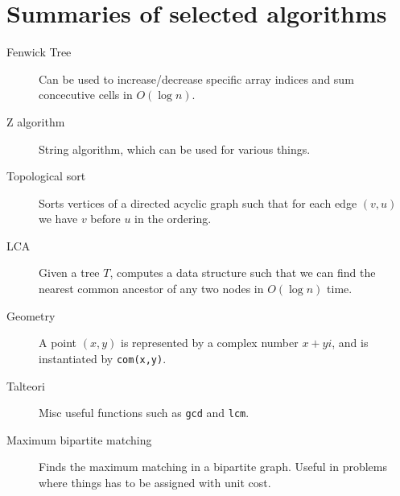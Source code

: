 \documentclass[a4paper,final,8pt]{article}
\begin{document}
\section{Summaries of selected algorithms}
\begin{description}
    \item [Fenwick Tree] Can be used to increase/decrease specific array
        indices and sum concecutive cells in $O(\log n)$.
    \item [Z algorithm] String algorithm, which can be used for various things.
    \item [Topological sort] Sorts vertices of a directed acyclic graph such
        that for each edge $(v,u)$ we have $v$ before $u$ in the ordering.
    \item [LCA] Given a tree $T$, computes a data structure such that we can
        find the nearest common ancestor of any two nodes in $O(\log n)$ time.
    \item [Geometry] A point $(x,y)$ is represented by a complex number $x +
        yi$, and is instantiated by \texttt{com(x,y)}.
    \item [Talteori] Misc useful functions such as \texttt{gcd} and
        \texttt{lcm}.
    \item [Maximum bipartite matching] Finds the maximum matching in a
        bipartite graph. Useful in problems where things has to be assigned
        with unit cost.
\end{description}
\end{document}
